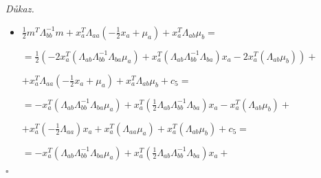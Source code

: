 \documentclass{article}
\newenvironment{pitemize}{
\begin{itemize}
  \setlength{\itemsep}{5pt}
  \setlength{\parskip}{0pt}
  \setlength{\parsep}{0pt}
}{\end{itemize}}
\newenvironment{pproof}{
\noindent\emph{Důkaz.}
\begin{pitemize}
}{\hfill$\square$\end{pitemize}}
\theoremstyle{definition}
\begin{document}
\begin{pproof}
\begin {itemize}
$+2\left(\Lambda_{ba}\mu_a-\Lambda_{ba}x_a
\right)^T\Lambda_{bb}^{-1}
\Lambda_{bb}\mu_b+
\mu_b^T\Lambda_{bb}^T
\Lambda_{bb}^{-1}
\Lambda_{bb}\mu_b=$

$=\left(\Lambda_{ba}\mu_a\right)^T\Lambda_{bb}^{-1}\Lambda_{ba}\mu_a
-2\left(\Lambda_{ba}\mu_a\right)^T\Lambda_{bb}^{-1}\Lambda_{ba}x_a
+\left(\Lambda_{ba}x_a\right)^T\Lambda_{bb}^{-1}\Lambda_{ba}x_a+$

\nopagebreak

$+2\left(\Lambda_{ba}\mu_a\right)^T\Lambda_{bb}^{-1}
\Lambda_{bb}\mu_b
-2\left(\Lambda_{ba}x_a
\right)^T\Lambda_{bb}^{-1}
\Lambda_{bb}\mu_b+
\mu_b^T\Lambda_{bb}^T
\Lambda_{bb}^{-1}
\Lambda_{bb}\mu_b=$

$=c_1-2x_a^T\left(\Lambda_{ba}^T\Lambda_{bb}^{-1}\Lambda_{ba}\mu_a\right)
+x_a^T\left(\Lambda_{ba}^T\Lambda_{bb}^{-1}\Lambda_{ba}\right)x_a
+c_2-2x_a^T\left(\Lambda_{ba}^T
\Lambda_{bb}^{-1}
\Lambda_{bb}\mu_b\right)+c_3=$


$=-2x_a^T\left(\Lambda_{ba}^T\Lambda_{bb}^{-1}\Lambda_{ba}\mu_a\right)
+x_a^T\left(\Lambda_{ba}^T\Lambda_{bb}^{-1}\Lambda_{ba}\right)x_a
-2x_a^T\left(\Lambda_{ba}^T
\mu_b\right)+c_4$ 

$=-2x_a^T\left(\Lambda_{ab}\Lambda_{bb}^{-1}\Lambda_{ba}\mu_a\right)
+x_a^T\left(\Lambda_{ab}\Lambda_{bb}^{-1}\Lambda_{ba}\right)x_a
-2x_a^T\left(\Lambda_{ab}
\mu_b\right)+c_4$ 

kde $c_n$ jsou konstanty nezávislé na $x_a$

\item $\frac{1}{2}m^T\Lambda_{bb}^{-1} m+
x_a^T\Lambda_{aa}\left(-\frac{1}{2}x_a+\mu_a\right)+
x_a^T\Lambda_{ab}\mu_b=$

$= \frac{1}{2}\left(-2x_a^T\left(\Lambda_{ab}\Lambda_{bb}^{-1}\Lambda_{ba}\mu_a\right)
+x_a^T\left(\Lambda_{ab}\Lambda_{bb}^{-1}\Lambda_{ba}\right)x_a
-2x_a^T\left(\Lambda_{ab}
\mu_b\right)\right)+$
\nopagebreak

$+
x_a^T\Lambda_{aa}\left(-\frac{1}{2}x_a+\mu_a\right)+
x_a^T\Lambda_{ab}\mu_b+c_5=$

$=
-x_a^T \left(\Lambda_{ab}\Lambda_{bb}^{-1} \Lambda_{ba}\mu_a\right)+
x_a^T\left (\frac{1}{2}\Lambda_{ab}\Lambda_{bb}^{-1}\Lambda_{ba}\right)x_a
-x_a^T\left(\Lambda_{ab}
\mu_b\right)+$
\nopagebreak

$+
x_a^T\left(-\frac{1}{2}\Lambda_{aa}\right)x_a+
x_a^T\left(\Lambda_{aa}\mu_a\right)+
x_a^T\left(\Lambda_{ab}\mu_b\right)+c_5=$


$=
-x_a^T \left(\Lambda_{ab}\Lambda_{bb}^{-1} \Lambda_{ba}\mu_a\right)+
x_a^T\left (\frac{1}{2}\Lambda_{ab}\Lambda_{bb}^{-1}\Lambda_{ba}\right)x_a
+$
\nopagebreak


\end{itemize}
\end{pproof}
\end{document}
